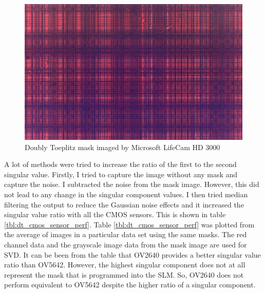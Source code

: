 \begin{figure}[h]
\centering
\includegraphics[scale=0.25]{pics/slm/lifecamdtmask.png}
\caption{Doubly Toeplitz mask imaged by Microsoft LifeCam HD 3000}
\label{fig:dt_lifecam}
\end{figure}
A lot of methods were tried to increase the ratio of the first to the second singular value. Firstly, I tried to capture the image without any mask and capture the noise. I subtracted the noise from the mask image. However, this did not lead to any change in the singular component values. I then tried median filtering the output to reduce the Gaussian noise effects and it increased the singular value ratio with all the CMOS sensors. This is shown in table \ref{tbl:dt_cmos_sensor_perf}. Table \ref{tbl:dt_cmos_sensor_perf} was plotted from the average of images in a particular data set using the same masks. The red channel data and the grayscale image data from the mask image are used for SVD. It can be been from the table that OV2640 provides a better singular value ratio than OV5642. However, the highest singular component does not at all represent the mask that is programmed into the SLM. So, OV2640 does not perform equivalent to OV5642 despite the higher ratio of a singular component.
